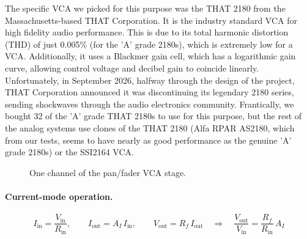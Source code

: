 \documentclass[11pt, letterpaper,titlepage]{article}
\begin{document}
The specific VCA we picked for this purpose was the THAT 2180 from the Massachusetts-based THAT Corporation. It is the industry standard VCA for high fidelity audio performance. This is due to its total harmonic distortion (THD) of just 0.005\% (for the 'A' grade 2180s), which is extremely low for a VCA. Additionally, it uses a Blackmer gain cell, which has a logarithmic gain curve, allowing control voltage and decibel gain to coincide linearly. Unfortunately, in September 2026, halfway through the design of the project, THAT Corporation announced it was discontinuing its legendary 2180 series, sending shockwaves through the audio electronics community. Frantically, we bought 32 of the 'A' grade THAT 2180s to use for this purpose, but the rest of the analog systems use clones of the THAT 2180 (Alfa RPAR AS2180, which from our tests, seems to have nearly as good performance as the genuine 'A' grade 2180s) or the SSI2164 VCA.


\begin{figure}[H]
    \centering
    \caption{One channel of the pan/fader VCA stage.}
    \label{fig:vca-stage}
\end{figure}

\paragraph{Current-mode operation.}
\begin{equation}
    I_\text{in} = \frac{V_\text{in}}{R_\text{in}}, \qquad
    I_\text{out} = A_I\, I_\text{in}, \qquad
    V_\text{out} = R_f\, I_\text{out}
    \quad\Longrightarrow\quad
    \frac{V_\text{out}}{V_\text{in}} = \frac{R_f}{R_\text{in}}\,A_I
    \label{eq:vca-transfer}
\end{equation}
\end{document}
